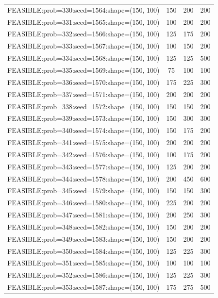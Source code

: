 \begin{longtable}{lccc}
FEASIBLE:prob=330:seed=1564:shape=(150, 100) &  150 &   200 &    200 \\
FEASIBLE:prob=331:seed=1565:shape=(150, 100) &  100 &   200 &    200 \\
FEASIBLE:prob=332:seed=1566:shape=(150, 100) &  125 &   175 &    200 \\
FEASIBLE:prob=333:seed=1567:shape=(150, 100) &  100 &   150 &    200 \\
FEASIBLE:prob=334:seed=1568:shape=(150, 100) &  125 &   125 &    500 \\
FEASIBLE:prob=335:seed=1569:shape=(150, 100) &   75 &   100 &    100 \\
FEASIBLE:prob=336:seed=1570:shape=(150, 100) &  175 &   225 &    300 \\
FEASIBLE:prob=337:seed=1571:shape=(150, 100) &  200 &   200 &    200 \\
FEASIBLE:prob=338:seed=1572:shape=(150, 100) &  150 &   150 &    200 \\
FEASIBLE:prob=339:seed=1573:shape=(150, 100) &  150 &   300 &    300 \\
FEASIBLE:prob=340:seed=1574:shape=(150, 100) &  150 &   175 &    200 \\
FEASIBLE:prob=341:seed=1575:shape=(150, 100) &  200 &   200 &    200 \\
FEASIBLE:prob=342:seed=1576:shape=(150, 100) &  100 &   175 &    200 \\
FEASIBLE:prob=343:seed=1577:shape=(150, 100) &  125 &   200 &    200 \\
FEASIBLE:prob=344:seed=1578:shape=(150, 100) &  200 &   450 &    600 \\
FEASIBLE:prob=345:seed=1579:shape=(150, 100) &  150 &   150 &    300 \\
FEASIBLE:prob=346:seed=1580:shape=(150, 100) &  225 &   200 &    200 \\
FEASIBLE:prob=347:seed=1581:shape=(150, 100) &  200 &   250 &    300 \\
FEASIBLE:prob=348:seed=1582:shape=(150, 100) &  150 &   200 &    200 \\
FEASIBLE:prob=349:seed=1583:shape=(150, 100) &  150 &   200 &    200 \\
FEASIBLE:prob=350:seed=1584:shape=(150, 100) &  125 &   225 &    300 \\
FEASIBLE:prob=351:seed=1585:shape=(150, 100) &  100 &   100 &    100 \\
FEASIBLE:prob=352:seed=1586:shape=(150, 100) &  125 &   225 &    300 \\
FEASIBLE:prob=353:seed=1587:shape=(150, 100) &  175 &   275 &    500 \\

\end{longtable}

